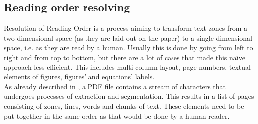 \subsection{Reading order resolving}\label{sec:reading_order}
Resolution of Reading Order is a process aiming to transform text zones from a two-dimensional space (as they are laid out on the paper) to a single-dimensional space, i.e. as they are read by a human. Usually this is done by going from left to right and from top to bottom, but there are a lot of cases that made this na\"\i ve approach less efficient. This includes multi-column layout, page numbers, textual elements of figures, figures' and equations' labels.\\

As already described in \cite{DominikaTkaczykPaweSzostekMateuszFedoryszakPiotrJanDendek2014}, a PDF file contains a stream of characters that undergoes processes of extraction and segmentation. This results in a list of pages consisting of zones, lines, words and chunks of text. These elements need to be put together in the same order as that would be done by a human reader.\\

